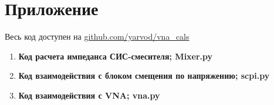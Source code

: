 \documentclass[a4paper]{article}
\begin{document}
\newpage
\section{Приложение}
Весь код доступен на \href{https://github.com/yarvod/vna_cals}{github.com/yarvod/vna\_cals}
\begin{enumerate}
    \item \textbf{Код расчета импеданса СИС-смесителя; Mixer.py} \par 
    
    \item \textbf{Код взаимодействия с блоком смещения по напряжению; scpi.py} \par 
    
    \item \textbf{Код взаимодействия с VNA; vna.py} \par 
    
\end{enumerate}
\end{document}
